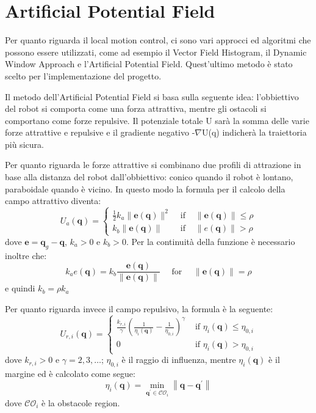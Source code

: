 \documentclass[Lau, binding=0.6cm, twoside]{sapthesis}
\begin{document}
\section{Artificial Potential Field}
Per quanto riguarda il local motion control, ci sono vari approcci ed algoritmi che possono essere utilizzati, come ad esempio il Vector Field Histogram, il Dynamic Window Approach e l'Artificial Potential Field.
Quest'ultimo metodo è stato scelto per l'implementazione del progetto.

Il metodo dell'Artificial Potential Field si basa sulla seguente idea: l'obbiettivo del robot si comporta come una forza attrattiva, mentre gli ostacoli si comportano come forze repulsive.
Il potenziale totale U sarà la somma delle varie forze attrattive e repulsive e il gradiente negativo -$\nabla$U(q) indicherà la traiettoria più sicura.\cite{fonte1}

Per quanto riguarda le forze attrattive si combinano due profili di attrazione in base alla distanza del robot dall'obbiettivo: conico quando il robot è lontano, paraboidale quando è vicino.
In questo modo la formula per il calcolo della campo attrattivo diventa:
\newline
$$
U_{a}(\boldsymbol{q})=\left\{\begin{array}{cll}
\frac{1}{2} k_{a}\|\boldsymbol{e}(\boldsymbol{q})\|^{2} & \text { if } & \|\boldsymbol{e}(\boldsymbol{q})\| \leq \rho \\
k_{b}\|\boldsymbol{e}(\boldsymbol{q})\| & \text { if } & \|e(\boldsymbol{q})\|>\rho
\end{array}\right.
$$
\newline
dove $\boldsymbol{e}=\boldsymbol{q}_{g}-\boldsymbol{q}$, $k_{a}>0$ e $k_{b}>0$.
Per la continuità della funzione è necessario inoltre che:
$$
k_{a} e(\boldsymbol{q})=k_{b} \frac{\boldsymbol{e}(\boldsymbol{q})}{\|\boldsymbol{e}(\boldsymbol{q})\|} \quad \text { for } \quad\|\boldsymbol{e}(\boldsymbol{q})\|=\rho
$$
\newline
e quindi $k_{b}=\rho k_{a}$
\cite{fonte1}

Per quanto riguarda invece il campo repulsivo, la formula è la seguente:
\newline
$$
U_{r, i}(\boldsymbol{q})=\left\{\begin{array}{ll}
\frac{k_{r, i}}{\gamma}\left(\frac{1}{\eta_{i}(\boldsymbol{q})}-\frac{1}{\eta_{0, i}}\right)^{\gamma} & \text { if } \eta_{i}(\boldsymbol{q}) \leq \eta_{0, i} \\
0 & \text { if } \eta_{i}(\boldsymbol{q})>\eta_{0, i}
\end{array}\right.
$$
\newline
dove $k_{r, i}>0$ e $\gamma=2,3, \ldots$; $\eta_{0, i}$ è il raggio di influenza, mentre $\eta_{i}(\boldsymbol{q})$ è il margine ed è calcolato come segue:
$$
\eta_{i}(\boldsymbol{q})=\min _{\boldsymbol{q}^{\prime} \in \mathcal{C O}_{i}}\left\|\boldsymbol{q}-\boldsymbol{q}^{\prime}\right\|
$$
\newline
dove $\mathcal{C O}_{i}$ è la obstacole region.\cite{fonte1}
\end{document}
